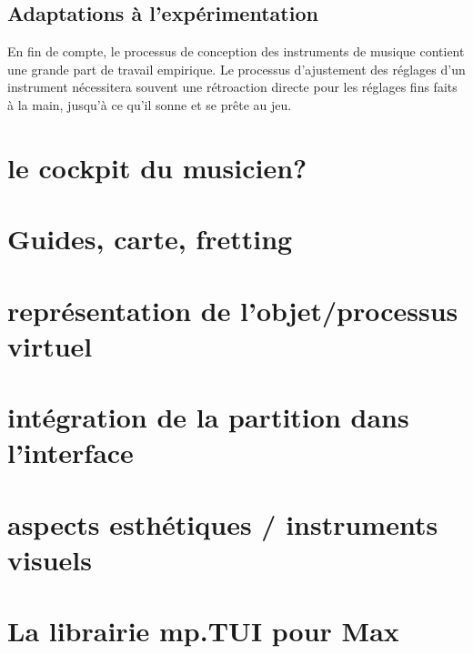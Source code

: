 \subsection{Adaptations à l'expérimentation}
En fin de compte, le processus de conception des instruments de musique contient une grande part de travail empirique. Le processus d'ajustement des réglages d'un instrument nécessitera souvent une rétroaction directe pour les réglages fins faits à la main, jusqu'à ce qu'il sonne et se prête au jeu.


\section{le cockpit du musicien?}
\label{sec:visual_representation:sec1}

\section{Guides, carte, fretting}

\section{représentation de l'objet/processus virtuel}

\section{intégration de la partition dans l'interface}

\section{aspects esthétiques / instruments visuels}

\section{La librairie mp.TUI pour Max}


